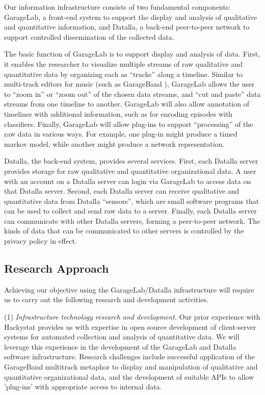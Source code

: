 Our information infrastructure consists of two fundamental components:
GarageLab, a front-end system to support the display and analysis of
qualitative and quantitative information, and Datalla, a back-end
peer-to-peer network to support controlled dissemination of the collected
data.

The basic function of GarageLab is to support display and analysis of data.
First, it enables the researcher to visualize multiple streams of raw
qualitative and quantitative data by organizing each as ``tracks'' along a
timeline.  Similar to multi-track editors for music (such as GarageBand
\cite{GarageBand}), GarageLab allows the user to ``zoom in'' or ``zoom
out'' of the chosen data streams, and ``cut and paste'' data streams from
one timeline to another.  GarageLab will also allow annotation of timelines
with additional information, such as for encoding episodes with
classifiers. Finally, GarageLab will allow plug-ins to support
``processing'' of the raw data in various ways.  For example, one plug-in
might produce a timed markov model, while another might produce a network
representation.

Datalla, the back-end system, provides several services.  First, each
Datalla server provides storage for raw qualitative and quantitative
organizational data.  A user with an account on a Datalla server can login
via GarageLab to access data on that Datalla server.  Second, each Datalla
server can receive qualitative and quantitative data from Datalla
``sensors'', which are small software programs that can be used to collect
and send raw data to a server.  Finally, each Datalla server can
communicate with other Datalla servers, forming a peer-to-peer network.
The kinds of data that can be communicated to other servers is controlled
by the privacy policy in effect.


\subsection{Research Approach}

Achieving our objective using the GarageLab/Datalla infrastructure will require us to 
carry out the following research and development activities. 

(1) {\em Infrastructure technology research and development.} Our prior
experience with Hackystat \cite{Hackystat} provides us with expertise in
open source development of client-server systems for automated collection
and analysis of quantitative data. We will leverage this experience in the
development of the GarageLab and Datalla software infrastructure. Research
challenges include successful application of the GarageBand multitrack
metaphor to display and manipulation of qualitative and quantitative
organizational data, and the development of suitable APIs to allow
'plug-ins' with appropriate access to internal data.

